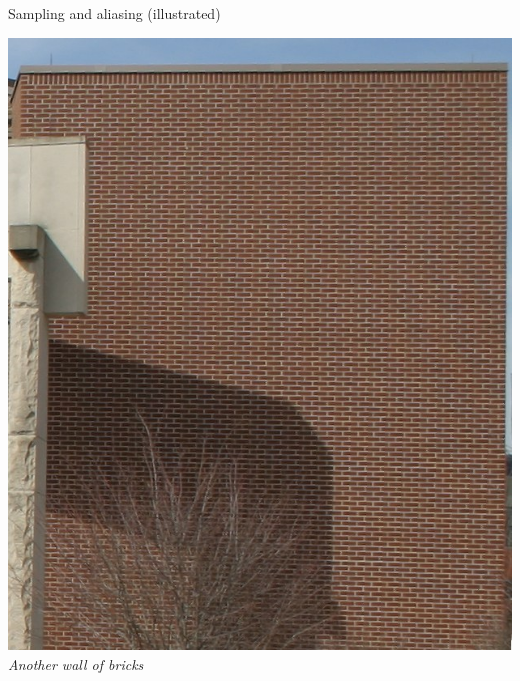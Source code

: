 \begin{frame}{Sampling and aliasing (illustrated)}
  \begin{minipage}[b]{0.29\textwidth}
    \centering
    \includegraphics[width=\textwidth]{slides/graphics-theory/bricks-rich.jpg}\\
    \textit{\small Another wall of bricks}
  \end{minipage}
  \hfill
  \begin{minipage}[b]{0.29\textwidth}
    \centering

\end{minipage}
\end{frame}

